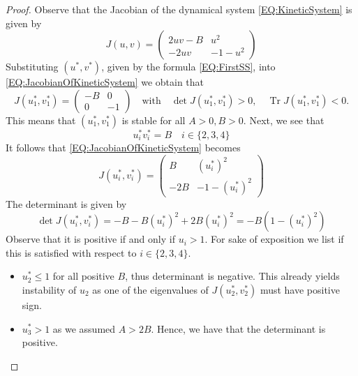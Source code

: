 \documentclass[12pt, a4paper]{article}
\theoremstyle{break}
\theoremstyle{break}
\theoremstyle{break}
\theoremstyle{break}
\theoremstyle{break}
\theoremstyle{break}
\theoremstyle{break}
\DeclareMathOperator{\Tr}{Tr}
\begin{document}
\begin{proof}
    Observe that the Jacobian of the dynamical system \eqref{EQ:KineticSystem} is given by
    \begin{equation}
        \label{EQ:JacobianOfKineticSystem}
        J(u, v) = \begin{pmatrix}
            2uv - B & u^2 \\ -2uv & -1 - u^2
        \end{pmatrix}
    \end{equation}
    Substituting  $(u^*, v^*)$, given by the formula \eqref{EQ:FirstSS}, into \eqref{EQ:JacobianOfKineticSystem} we obtain that
    \begin{equation*}
        J(u^*_1, v^*_1) = \begin{pmatrix}
            - B & 0 \\ 0 & -1
        \end{pmatrix} \quad \text{with} \quad \det J(u^*_1, v^*_1) > 0, \quad \Tr J(u^*_1, v^*_1) < 0.
    \end{equation*}
    This means that $(u^*_1, v^*_1)$ is stable for all $A > 0, B > 0$. Next, we see that 
    \begin{equation*}
        u_i^* v_i^* = B \quad i \in \{2, 3, 4\}
    \end{equation*}
    It follows that \eqref{EQ:JacobianOfKineticSystem} becomes
    \begin{equation}
        \label{EQ:JacobianOfKineticSystemPlugged}
        J(u^*_i, v^*_i) = \begin{pmatrix}
            B & (u^*_i)^2 \\ -2B & -1 - (u^*_i)^2
        \end{pmatrix}
    \end{equation}
    The determinant is given by
    \begin{equation}
        \label{EQ:DeterminantLinearizationKinetic}
        \det J(u^*_i, v^*_i) = -B -B(u_i^*)^2 + 2B(u_i^*)^2 = -B(1-(u_i^*)^2)
    \end{equation}
    Observe that it is positive if and only if $u_i > 1$. For sake of exposition we list if this is satisfied with respect to $i \in \{2, 3, 4\}$.
    \begin{itemize}
        \item $u_2^* \leq 1$ for all positive $B$, thus determinant is negative. This already yields instability of $u_2$ as one of the eigenvalues of $J(u_2^*, v_2^*)$ must have positive sign.
        \item $u_3^* > 1$ as we assumed $A > 2B$. Hence, we have that the determinant is positive.

\end{itemize}
\end{proof}
\end{document}
